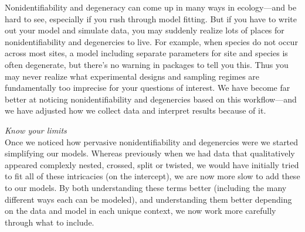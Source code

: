\documentclass[11pt]{article}
\begin{document}
{%
Nonidentifiability and degeneracy can come up in many ways in ecology---and be hard to see, especially if you rush through model fitting. But if you have to write out your model and simulate data, you may suddenly realize lots of places for nonidentifiability and degenercies to live. For example, when species do not occur across most sites, a model including separate parameters for site and species is often degenerate, but there's no warning in packages to tell you this. Thus you may never realize what experimental designs and sampling regimes are fundamentally too imprecise for your questions of interest. We have become far better at noticing nonidentifiability and degenercies based on this workflow---and we have adjusted how we collect data and interpret results because of it. %

 \emph{Know your limits} \\ %
Once we noticed how pervasive nonidentifiability and degenercies were we started simplifying our models. Whereas previously when we had data that qualitatively appeared complexly nested, crossed, split or twisted, we would have initially tried to fit all of these intricacies (on the intercept), we are now more slow to add these to our models. By both understanding these terms better (including the many different ways each can be modeled), and understanding them better depending on the data and model in each unique context, we now work more carefully through what to include. %

}
\end{document}
